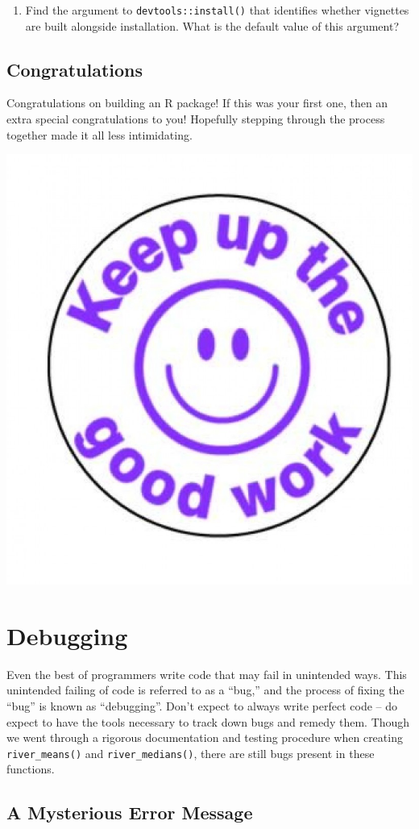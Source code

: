 \documentclass[
]{book}
\providecommand{\tightlist}{%
  \setlength{\itemsep}{0pt}\setlength{\parskip}{0pt}}
\begin{document}
\begin{enumerate}
\def\labelenumi{\arabic{enumi}.}
\tightlist
\item
  Find the argument to \texttt{devtools::install()} that identifies whether vignettes are built alongside installation. What is the default value of this argument?
\end{enumerate}

\hypertarget{congratulations}{%
\subsection{Congratulations}\label{congratulations}}

Congratulations on building an R package! If this was your first one, then an extra special congratulations to you! Hopefully stepping through the process together made it all less intimidating.

\includegraphics[width=0.5\linewidth]{images/you_did_it}

\hypertarget{debugging}{%
\section{Debugging}\label{debugging}}

Even the best of programmers write code that may fail in unintended ways. This unintended failing of code is referred to as a ``bug,'' and the process of fixing the ``bug'' is known as ``debugging''. Don't expect to always write perfect code -- do expect to have the tools necessary to track down bugs and remedy them. Though we went through a rigorous documentation and testing procedure when creating \texttt{river\_means()} and \texttt{river\_medians()}, there are still bugs present in these functions.

\hypertarget{error-onematch}{%
\subsection{A Mysterious Error Message}\label{error-onematch}}
\end{document}
